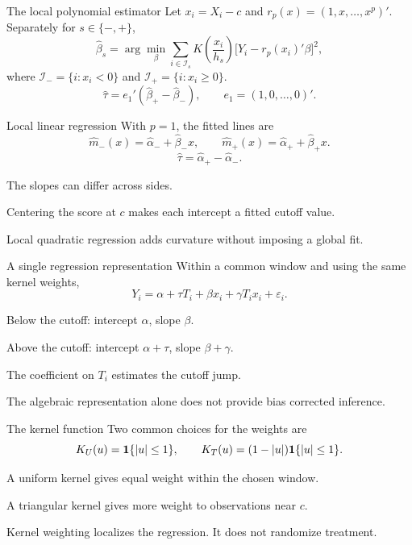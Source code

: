 \begin{frame}{The local polynomial estimator}
Let $x_i=X_i-c$ and $r_p(x)=(1,x,\ldots,x^p)'$. Separately for $s\in\{-,+\}$,
\[
\widehat\beta_s=\arg\min_{\beta}\sum_{i\in\mathcal I_s}
 K\!\left(\frac{x_i}{h_s}\right)\big[Y_i-r_p(x_i)'\beta\big]^2,
\]
where $\mathcal I_- =\{i:x_i<0\}$ and $\mathcal I_+=\{i:x_i\geq0\}$.
\[
\widehat\tau=e_1'(\widehat\beta_+-\widehat\beta_-),
\qquad e_1=(1,0,\ldots,0)'.
\]
\end{frame}

\begin{frame}{Local linear regression}
With $p=1$, the fitted lines are
\[
\widehat m_-(x)=\widehat\alpha_-+\widehat\beta_-x,
\qquad
\widehat m_+(x)=\widehat\alpha_++\widehat\beta_+x.
\]
\[
\widehat\tau=\widehat\alpha_+-\widehat\alpha_-.
\]
\begin{items}
\item The slopes can differ across sides.
\item Centering the score at $c$ makes each intercept a fitted cutoff value.
\item Local quadratic regression adds curvature without imposing a global fit.
\end{items}
\end{frame}

\begin{frame}{A single regression representation}
Within a common window and using the same kernel weights,
\[
Y_i=\alpha+\tau T_i+\beta x_i+\gamma T_ix_i+\varepsilon_i.
\]
\begin{items}
\item Below the cutoff: intercept $\alpha$, slope $\beta$.
\item Above the cutoff: intercept $\alpha+\tau$, slope $\beta+\gamma$.
\item The coefficient on $T_i$ estimates the cutoff jump.
\item The algebraic representation alone does not provide bias corrected inference.
\end{items}
\end{frame}

\begin{frame}{The kernel function}
Two common choices for the weights are
\[
K_U(u)=\mathbf{1}\{|u|\leq1\},\qquad
K_T(u)=(1-|u|)\mathbf{1}\{|u|\leq1\}.
\]
\begin{items}
\item A uniform kernel gives equal weight within the chosen window.
\item A triangular kernel gives more weight to observations near $c$.
\item Kernel weighting localizes the regression. It does not randomize treatment.
\end{items}
\end{frame}


